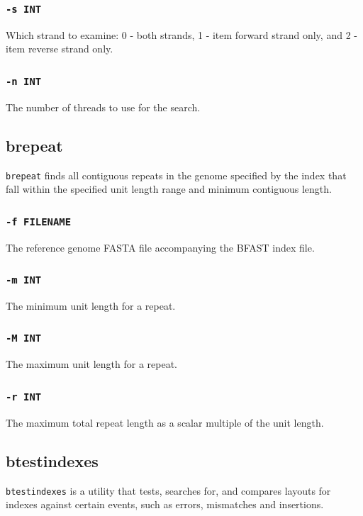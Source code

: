 \documentclass[a4paper,12pt]{book}
\newcommand{\TT}[1]{{\tt #1}} %
\newcommand{\rGFF}{reference genome FASTA file}
\newcommand{\BIF}{BFAST index file} %
\begin{document}
\subsubsection{\TT{-s INT}}
Which strand to examine: 0 - both strands, 1 - item forward strand only, and 2 - item reverse strand only.

\subsubsection{\TT{-n INT}}
The number of threads to use for the search.

\subsection{brepeat}
\label{sec:brepeat}
\TT{brepeat} finds all contiguous repeats in the genome specified by the index that fall within the specified unit length range and minimum contiguous length.

\subsubsection{\TT{-f FILENAME}}
The \rGFF{} accompanying the \BIF{}.

\subsubsection{\TT{-m INT}}
The minimum unit length for a repeat.

\subsubsection{\TT{-M INT}}
The maximum unit length for a repeat.

\subsubsection{\TT{-r INT}}
The maximum total repeat length as a scalar multiple of the unit length.

\subsection{btestindexes}
\label{sec:btestindexes}
\TT{btestindexes} is a utility that tests, searches for, and compares layouts for indexes against certain events, such as errors, mismatches and insertions.
\end{document}
